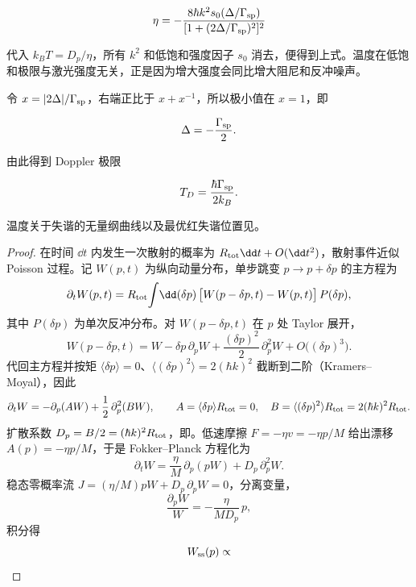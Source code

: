 \[
\eta
=-\frac{8\hbar k^2s_0(\Delta/\Gamma_{\rm sp})}
{[1+(2\Delta/\Gamma_{\rm sp})^2]^2}
\]

代入 \(k_BT=D_p/\eta\)，所有 \(k^2\) 和低饱和强度因子 \(s_0\) 消去，便得到上式。温度在低饱和极限与激光强度无关，正是因为增大强度会同比增大阻尼和反冲噪声。

令 \(x=|2\Delta|/\Gamma_{\rm sp}\)，右端正比于 \(x+x^{-1}\)，所以极小值在 \(x=1\)，即

\[
\Delta=-\frac{\Gamma_{\rm sp}}{2}.
\]

由此得到 Doppler 极限

\[
T_D=\frac{\hbar\Gamma_{\rm sp}}{2k_B}.
\]

温度关于失谐的无量纲曲线以及最优红失谐位置见。

\begin{proof}
在时间 $\dd t$ 内发生一次散射的概率为 $R_{\rm tot}\dd t+O(\dd t^2)$，散射事件近似 Poisson 过程。记 $W(p,t)$ 为纵向动量分布，单步跳变 $p\to p+\delta p$ 的主方程为
\begin{equation*}
\partial_t W(p,t)
= R_{\rm tot}\!\int\! \dd(\delta p)\,
 \bigl[W(p-\delta p,t)-W(p,t)\bigr]\,P(\delta p),
\end{equation*}
其中 $P(\delta p)$ 为单次反冲分布。对 $W(p-\delta p,t)$ 在 $p$ 处 Taylor 展开，
\begin{equation*}
W(p-\delta p,t)
= W - \delta p\,\partial_p W
 + \frac{(\delta p)^2}{2}\,\partial_p^2 W + O\bigl((\delta p)^3\bigr).
\end{equation*}
代回主方程并按矩 $\langle\delta p\rangle=0$、$\langle(\delta p)^2\rangle=2(\hbar k)^2$ 截断到二阶（Kramers--Moyal），因此
\begin{equation*}
\partial_t W
= -\partial_p(AW)+\frac12\,\partial_p^2(BW),
\qquad
A=\langle\delta p\rangle R_{\rm tot}=0,
\quad
B=\langle(\delta p)^2\rangle R_{\rm tot}=2(\hbar k)^2 R_{\rm tot}.
\end{equation*}
扩散系数 $D_p=B/2=(\hbar k)^2 R_{\rm tot}$，即。低速摩擦 $F=-\eta v=-\eta p/M$ 给出漂移 $A(p)=-\eta p/M$，于是 Fokker--Planck 方程化为
\begin{equation*}
\partial_t W
= \frac{\eta}{M}\,\partial_p(pW)+D_p\,\partial_p^2 W.
\end{equation*}
稳态零概率流 $J=(\eta/M)pW+D_p\,\partial_p W=0$，分离变量，
\begin{equation*}
\frac{\partial_p W}{W}
= -\frac{\eta}{M D_p}\,p,
\end{equation*}
积分得
\begin{equation*}
W_{\rm ss}(p)\propto

\end{equation*}
\end{proof}

